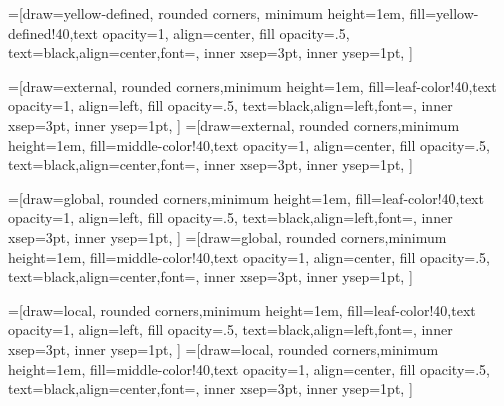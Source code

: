 \usetikzlibrary{trees}
\usetikzlibrary{matrix, patterns, positioning}







=[draw=yellow-defined,
    rounded corners, minimum height=1em,
    fill=yellow-defined!40,text opacity=1, align=center,
    fill opacity=.5,  text=black,align=center,font=\footnotesize,
    inner xsep=3pt,
    inner ysep=1pt,
]

=[draw=external,
    rounded corners,minimum height=1em,
    fill=leaf-color!40,text opacity=1, align=left,
    fill opacity=.5,  text=black,align=left,font=\footnotesize,
    inner xsep=3pt,
    inner ysep=1pt,
]
=[draw=external,
    rounded corners,minimum height=1em,
    fill=middle-color!40,text opacity=1, align=center,
    fill opacity=.5,  text=black,align=center,font=\footnotesize,
    inner xsep=3pt,
    inner ysep=1pt,
]
    
=[draw=global,
    rounded corners,minimum height=1em,
    fill=leaf-color!40,text opacity=1, align=left,
    fill opacity=.5,  text=black,align=left,font=\footnotesize,
    inner xsep=3pt,
    inner ysep=1pt,
]
=[draw=global,
    rounded corners,minimum height=1em,
    fill=middle-color!40,text opacity=1, align=center,
    fill opacity=.5,  text=black,align=center,font=\footnotesize,
    inner xsep=3pt,
    inner ysep=1pt,
]

=[draw=local,
    rounded corners,minimum height=1em,
    fill=leaf-color!40,text opacity=1, align=left,
    fill opacity=.5,  text=black,align=left,font=\footnotesize,
    inner xsep=3pt,
    inner ysep=1pt,
]
=[draw=local,
    rounded corners,minimum height=1em,
    fill=middle-color!40,text opacity=1, align=center,
    fill opacity=.5,  text=black,align=center,font=\footnotesize,
    inner xsep=3pt,
    inner ysep=1pt,
]


